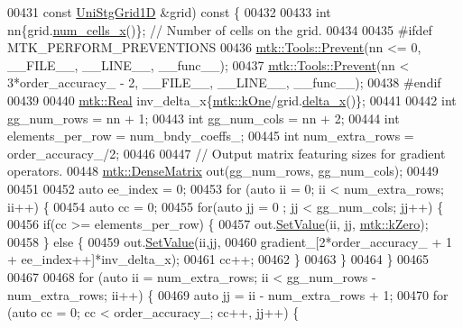 \begin{DoxyCode}
{{00431   \textcolor{keyword}{const} \hyperlink{classmtk_1_1UniStgGrid1D}{UniStgGrid1D} &grid)\textcolor{keyword}{ const }\{
00432 
00433   \textcolor{keywordtype}{int} nn\{grid.\hyperlink{classmtk_1_1UniStgGrid1D_af1b3729d8afa07be5b2775ed68015b80}{num\_cells\_x}()\}; \textcolor{comment}{// Number of cells on the grid.}
00434 
00435 \textcolor{preprocessor}{  #ifdef MTK\_PERFORM\_PREVENTIONS}
00436   \hyperlink{classmtk_1_1Tools_a332324c6f25e66be9dff48c5987a3b9f}{mtk::Tools::Prevent}(nn <= 0, \_\_FILE\_\_, \_\_LINE\_\_, \_\_func\_\_);
00437   \hyperlink{classmtk_1_1Tools_a332324c6f25e66be9dff48c5987a3b9f}{mtk::Tools::Prevent}(nn < 3*order\_accuracy\_ - 2, \_\_FILE\_\_, \_\_LINE\_\_, \_\_func\_\_);
00438 \textcolor{preprocessor}{  #endif}
00439 
00440   \hyperlink{group__c01-roots_gac080bbbf5cbb5502c9f00405f894857d}{mtk::Real} inv\_delta\_x\{\hyperlink{group__c01-roots_ga26407c24d43b6b95480943340d285c71}{mtk::kOne}/grid.\hyperlink{classmtk_1_1UniStgGrid1D_a6e7173b01241632cf509496d66b9f74c}{delta\_x}()\};
00441 
00442   \textcolor{keywordtype}{int} gg\_num\_rows = nn + 1;
00443   \textcolor{keywordtype}{int} gg\_num\_cols = nn + 2;
00444   \textcolor{keywordtype}{int} elements\_per\_row = num\_bndy\_coeffs\_;
00445   \textcolor{keywordtype}{int} num\_extra\_rows = order\_accuracy\_/2;
00446 
00447   \textcolor{comment}{// Output matrix featuring sizes for gradient operators.}
00448   \hyperlink{classmtk_1_1DenseMatrix}{mtk::DenseMatrix} out(gg\_num\_rows, gg\_num\_cols);
00449 
00451 
00452   \textcolor{keyword}{auto} ee\_index = 0;
00453   \textcolor{keywordflow}{for} (\textcolor{keyword}{auto} ii = 0; ii < num\_extra\_rows; ii++) \{
00454     \textcolor{keyword}{auto} cc = 0;
00455     \textcolor{keywordflow}{for}(\textcolor{keyword}{auto} jj = 0 ; jj < gg\_num\_cols; jj++) \{
00456       \textcolor{keywordflow}{if}(cc >= elements\_per\_row) \{
00457         out.\hyperlink{classmtk_1_1DenseMatrix_a784ce5784109ac86bfb9d8562b334b13}{SetValue}(ii, jj, \hyperlink{group__c01-roots_ga59a451a5fae30d59649bcda274fea271}{mtk::kZero});
00458       \} \textcolor{keywordflow}{else} \{
00459         out.\hyperlink{classmtk_1_1DenseMatrix_a784ce5784109ac86bfb9d8562b334b13}{SetValue}(ii,jj,
00460                      gradient\_[2*order\_accuracy\_ + 1 + ee\_index++]*inv\_delta\_x);
00461         cc++;
00462       \}
00463     \}
00464   \}
00465 
00467 
00468   \textcolor{keywordflow}{for} (\textcolor{keyword}{auto} ii = num\_extra\_rows; ii < gg\_num\_rows - num\_extra\_rows; ii++) \{
00469     \textcolor{keyword}{auto} jj = ii - num\_extra\_rows + 1;
00470     \textcolor{keywordflow}{for} (\textcolor{keyword}{auto} cc = 0; cc < order\_accuracy\_; cc++, jj++) \{
}}
\end{DoxyCode}
